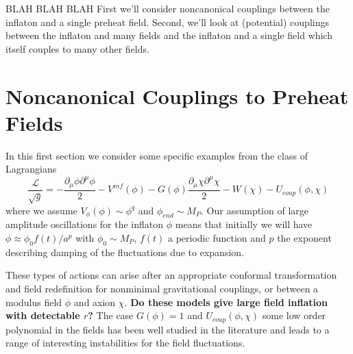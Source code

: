 \documentclass[a4paper,11pt]{article}
\begin{document}
BLAH BLAH BLAH
First we'll consider noncanonical couplings between the inflaton and a single preheat field.
Second, we'll look at (potential) couplings between the inflaton and many fields and the inflaton and a single field which itself couples to many other fields.

\section{Noncanonical Couplings to Preheat Fields}
In this first section we consider some specific examples from the class of Lagrangians
\begin{equation}
  \frac{\mathcal{L}}{\sqrt{g}} = -\frac{\partial_\mu\phi\partial^\mu\phi}{2} - V^{inf}(\phi) - G(\phi)\frac{\partial_\mu\chi\partial^\mu\chi}{2} - W(\chi) - U_{coup}(\phi,\chi)
\end{equation}
where we assume $V_\phi(\phi) \sim \phi^q$ and $\phi_{end} \sim M_P$.
Our assumption of large amplitude oscillations for the inflaton $\phi$ means that initially we will have $\phi \approx \phi_0f(t)/a^p$ with $\phi_0 \sim M_P$, $f(t)$ a periodic function and $p$ the exponent describing damping of the fluctuations due to expansion.

These types of actions can arise after an appropriate conformal transformation and field redefinition for nonminimal gravitational couplings, or between a modulus field $\phi$ and axion $\chi$.
{\bf Do these models give large field inflation with detectable $r$?}
The case $G(\phi)=1$ and $U_{coup}(\phi,\chi)$ some low order polynomial in the fields has been well studied in the literature and leads to a range of interesting instabilities for the field fluctuations.

\end{document}
